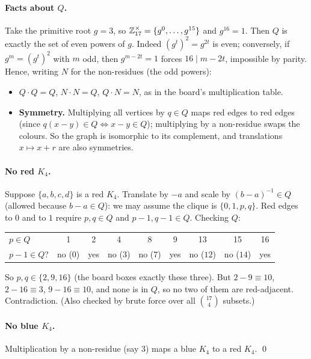 \documentclass[11pt]{article}
\begin{document}
\paragraph{Facts about $Q$.} Take the primitive root $g=3$, so $\mathbb{Z}_{17}^\times=\{g^0,\dots,g^{15}\}$ and $g^{16}=1$. Then $Q$ is exactly the set of even powers of $g$. Indeed $(g^t)^2=g^{2t}$ is even; conversely, if $g^m=(g^t)^2$ with $m$ odd, then $g^{m-2t}=1$ forces $16\mid m-2t$, impossible by parity. Hence, writing $N$ for the non-residues (the odd powers):
\begin{itemize}[nosep]
  \item $Q\cdot Q=Q$, $N\cdot N=Q$, $Q\cdot N=N$, as in the board's multiplication table.
  \item \textbf{Symmetry.} Multiplying all vertices by $q\in Q$ maps red edges to red edges (since $q(x-y)\in Q\iff x-y\in Q$); multiplying by a non-residue swaps the colours. So the graph is isomorphic to its complement, and translations $x\mapsto x+r$ are also symmetries.
\end{itemize}

\paragraph{No red $K_4$.} Suppose $\{a,b,c,d\}$ is a red $K_4$. Translate by $-a$ and scale by $(b-a)^{-1}\in Q$ (allowed because $b-a\in Q$): we may assume the clique is $\{0,1,p,q\}$. Red edges to $0$ and to $1$ require $p,q\in Q$ and $p-1,q-1\in Q$. Checking $Q$:

\begin{center}
\begin{tabular}{@{}lcccccccc@{}}
\toprule
$p\in Q$ & 1 & 2 & 4 & 8 & 9 & 13 & 15 & 16\\
$p-1\in Q$? & no ($0$) & yes & no ($3$) & no ($7$) & yes & no ($12$) & no ($14$) & yes\\
\bottomrule
\end{tabular}
\end{center}

So $p,q\in\{2,9,16\}$ (the board boxes exactly these three). But $2-9\equiv10$, $2-16\equiv3$, $9-16\equiv10$, and none is in $Q$, so no two of them are red-adjacent. Contradiction. (Also checked by brute force over all $\binom{17}{4}$ subsets.)

\paragraph{No blue $K_4$.} Multiplication by a non-residue (say $3$) maps a blue $K_4$ to a red $K_4$. \qed
\end{document}
